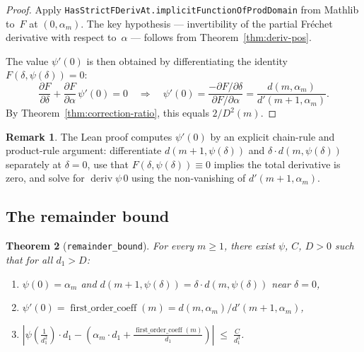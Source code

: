 \documentclass[11pt,a4paper]{article}
\theoremstyle{plain}
\newtheorem{theorem}{Theorem}[section]
\theoremstyle{definition}
\newtheorem{remark}[theorem]{Remark}
\newcommand{\Dsq}{D^2}
\newcommand{\alpham}{\alpha_m}
\newcommand{\lean}[1]{\texttt{#1}}
\begin{document}
\begin{proof}
Apply \lean{HasStrictFDerivAt.implicitFunctionOfProdDomain}
from Mathlib to~$F$ at $(0,\alpham)$.  The key hypothesis ---
invertibility of the partial Fr\'echet derivative with respect
to~$\alpha$ --- follows from Theorem~\ref{thm:deriv-pos}.

The value $\psi'(0)$ is then obtained by differentiating the identity
$F(\delta, \psi(\delta)) = 0$:
\[
  \frac{\partial F}{\partial\delta} + \frac{\partial F}{\partial\alpha}\,\psi'(0) = 0
  \quad\Longrightarrow\quad
  \psi'(0) = \frac{-\partial F/\partial\delta}{\partial F/\partial\alpha}
  = \frac{d(m,\alpham)}{d'(m{+}1,\alpham)}.
\]
By Theorem~\ref{thm:correction-ratio}, this equals $2/\Dsq(m)$.
\end{proof}

\begin{remark}
The Lean proof computes $\psi'(0)$ by an explicit chain-rule and
product-rule argument: differentiate $d(m{+}1, \psi(\delta))$ and
$\delta \cdot d(m, \psi(\delta))$ separately at $\delta = 0$,
use that $F(\delta,\psi(\delta)) \equiv 0$ implies the total
derivative is zero, and solve for $\operatorname{deriv} \psi\, 0$
using the non-vanishing of $d'(m{+}1,\alpham)$.
\end{remark}

\subsection{The remainder bound}

\begin{theorem}[\lean{remainder\_bound}]
\label{thm:remainder}
For every $m \ge 1$, there exist $\psi$, $C$, $D > 0$ such that
for all $d_1 > D$:
\begin{enumerate}[label=(\roman*)]
  \item $\psi(0) = \alpham$ and $d(m{+}1, \psi(\delta)) = \delta \cdot d(m, \psi(\delta))$
    near $\delta = 0$,
  \item $\psi'(0) = \operatorname{first\_order\_coeff}(m) = d(m,\alpham)/d'(m{+}1,\alpham)$,
  \item $\displaystyle\left|\psi\!\left(\frac{1}{d_1^2}\right) \cdot d_1
    - \left(\alpham \cdot d_1 + \frac{\operatorname{first\_order\_coeff}(m)}{d_1}\right)\right|
    \;\le\; \frac{C}{d_1^3}$.
\end{enumerate}
\end{theorem}
\end{document}
